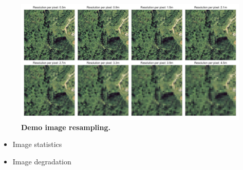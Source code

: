 \begin{figure}%
	\centering
	\captionsetup{width=1\linewidth}
	\includegraphics[width=1\textwidth]{Figures/demo_degrade.pdf}
	\caption{\textbf{Demo image resampling.} }
	\label{fig:degrade}
\end{figure}


\begin{itemize}
\item Image statistics 
\item Image degradation



\end{itemize}

